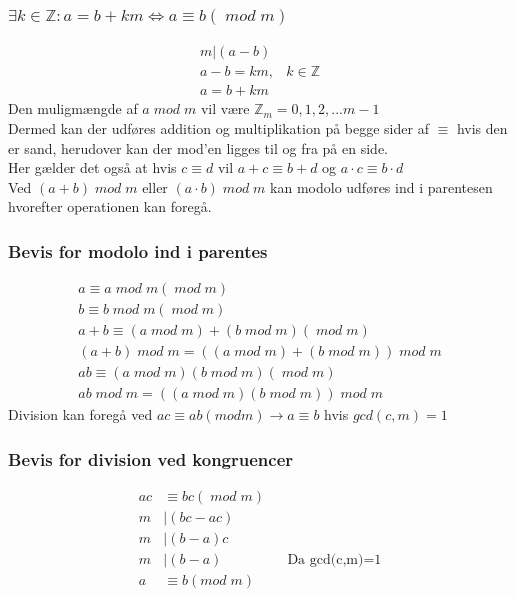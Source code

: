 \documentclass[12pt, a4paper]{article}
\begin{document}
				\subsubsection{$\exists k \in \mathbb{Z}: a=b+km \iff a\equiv b (\; mod \; m)$} 
					\begin{align*}
						m|(a-b)\\
						a-b=km, &k\in\mathbb{Z}\\
						a=b+km
					\end{align*}
				Den muligmængde af $a \; mod \; m$ vil være $\mathbb{Z}_m = {0,1,2,... m-1}$\\
				Dermed kan der udføres addition og multiplikation på begge sider af $\equiv$ hvis den er sand, herudover kan der mod'en ligges til og fra på en side.\\
				Her gælder det også at hvis $c\equiv d$ vil $a+c\equiv b+d$ og $a\cdot c \equiv b\cdot d$\\
				Ved $(a+b) \; mod \; m$ eller $(a\cdot b) \; mod \; m$ kan modolo udføres ind i parentesen hvorefter operationen kan foregå.\\
				\subsubsection{Bevis for modolo ind i parentes}
					\begin{align*}
						a\equiv a \; mod \; m (\; mod \; m)\\
						b \equiv b \; mod \; m (\; mod \; m)\\
						a+b\equiv (a \; mod \; m) + (b \; mod \; m) (\; mod \; m)\\
						(a+b) \; mod \; m = ((a \; mod \; m) + (b \; mod \; m)) \; mod \; m\\[4mm]
						ab\equiv (a \; mod \; m)(b \; mod \; m) (\; mod \; m)\\
						ab \; mod \; m = ((a \; mod \; m )(b \; mod \; m)) \; mod \; m
					\end{align*}
				Division kan foregå ved $ac\equiv ab (mod m)\rightarrow a\equiv b$ hvis $gcd(c,m)=1$\\
				\subsubsection{Bevis for division ved kongruencer}
					\begin{align*}
						ac&\equiv bc (\;mod\; m)\\
						m&|(bc-ac)\\
						m&|(b-a)c\\
						m&|(b-a) &&\text{Da gcd(c,m)=1}\\
						a&\equiv b (mod\; m)
					\end{align*}
\end{document}
